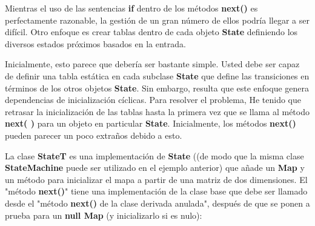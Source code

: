   Mientras el uso de las sentencias \textbf{if} dentro de los métodos \textbf{next()} es perfectamente razonable, la gestión de un gran número de ellos podría llegar a ser difícil. Otro enfoque es crear tablas dentro de cada objeto \textbf{State} definiendo los diversos estados próximos basados en la entrada.    \newline
  
  Inicialmente, esto parece que debería ser bastante simple. Usted debe ser capaz de definir una tabla estática en cada subclase \textbf{State} que define las transiciones en términos de los otros objetos \textbf{State}. Sin embargo, resulta que este enfoque genera dependencias de inicialización cíclicas. Para resolver el problema, He tenido que retrasar la inicialización de las tablas hasta la primera vez que se llama al método  \textbf{next( )} para un objeto en particular \textbf{State}. Inicialmente, los métodos \textbf{next()} pueden parecer un poco extraños debido a esto.\newline
  
  La clase \textbf{StateT} es una implementación de \textbf{State} ((de modo que la misma clase \textbf{StateMachine} puede ser utilizado en el ejemplo anterior) que añade un \textbf{Map} y un método para inicializar el mapa a partir de una matriz de dos dimensiones. El "método \textbf{next()}" tiene una implementación de la clase base que debe ser llamado desde el "método \textbf{next()} de la clase derivada anulada", después de que se ponen a prueba para un \textbf{null Map} (y inicializarlo si es nulo):  \newline
  
